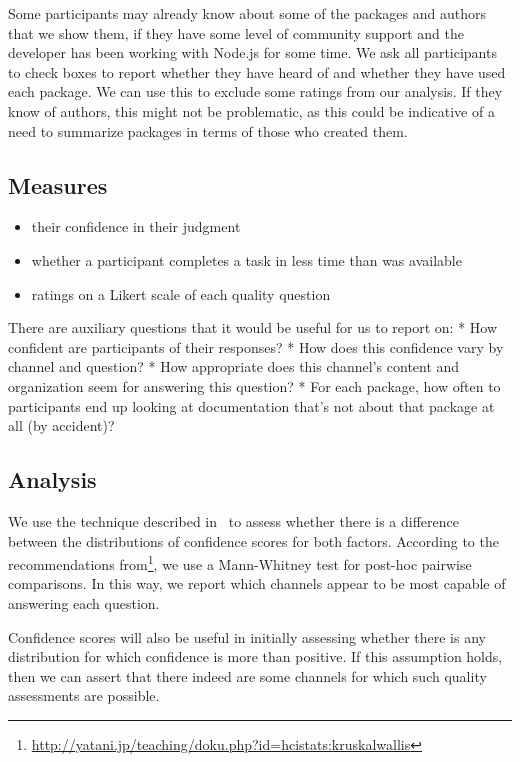 Some participants may already know about some of the packages and authors that we show them, if they have some level of community support and the developer has been working with Node.js for some time.
We ask all participants to check boxes to report whether they have heard of and whether they have used each package.
 We can use this to exclude some ratings from our analysis.
 If they know of authors, this might not be problematic, as this could be indicative of a need to summarize packages in terms of those who created them.

 \subsection{Measures}

 \begin{itemize}
 \item their confidence in their judgment
 \item whether a participant completes a task in less time than was available 
 \item ratings on a Likert scale of each quality question
 \end{itemize}

 There are auxiliary questions that it would be useful for us to report on:
 * How confident are participants of their responses?
 * How does this confidence vary by channel and question?
 * How appropriate does this channel's content and organization seem for answering this question?
 * For each package, how often to participants end up looking at documentation that's not about that package at all (by accident)?
 \fi

 \subsection{Analysis}

 We use the technique described in~\cite{kaptein_powerful_2010} to assess whether there is a difference between the distributions of confidence scores for both factors.
 According to the recommendations from\footnote{\url{http://yatani.jp/teaching/doku.php?id=hcistats:kruskalwallis}}, we use a Mann-Whitney test for post-hoc pairwise comparisons.
 In this way, we report which channels appear to be most capable of answering each question.

 Confidence scores will also be useful in initially assessing whether there is any distribution for which confidence is more than positive.
 If this assumption holds, then we can assert that there indeed are some channels for which such quality assessments are possible.

